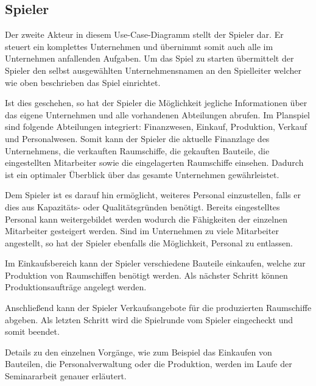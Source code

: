 \subsection{Spieler}
\label{sec:fachkonzept-spieler}

Der zweite Akteur in diesem Use-Case-Diagramm stellt der Spieler dar. Er steuert ein komplettes Unternehmen und übernimmt somit auch alle im Unternehmen anfallenden Aufgaben.
Um das Spiel zu starten übermittelt der Spieler den selbst ausgewählten Unternehmensnamen an den Spielleiter welcher wie oben beschrieben das Spiel einrichtet.

Ist dies geschehen, so hat der Spieler die Möglichkeit jegliche Informationen über das eigene Unternehmen und alle vorhandenen Abteilungen abrufen. Im Planspiel sind folgende Abteilungen integriert: Finanzwesen, Einkauf, Produktion, Verkauf und Personalwesen. Somit kann der Spieler die aktuelle Finanzlage des Unternehmens, die verkauften Raumschiffe, die gekauften Bauteile, die eingestellten Mitarbeiter sowie die eingelagerten Raumschiffe einsehen. Dadurch ist ein optimaler Überblick über das gesamte Unternehmen gewährleistet.

Dem Spieler ist es darauf hin ermöglicht, weiteres Personal einzustellen, falls er dies aus Kapazitäts- oder Qualitätsgründen benötigt. Bereits eingestelltes Personal kann weitergebildet werden wodurch die Fähigkeiten der einzelnen Mitarbeiter gesteigert werden. Sind im Unternehmen zu viele Mitarbeiter angestellt, so hat der Spieler ebenfalls die Möglichkeit, Personal zu entlassen.

Im Einkaufsbereich kann der Spieler verschiedene Bauteile einkaufen, welche zur Produktion von Raumschiffen benötigt werden. Als nächster Schritt können Produktionsaufträge angelegt werden. 

Anschließend kann der Spieler Verkaufsangebote für die produzierten Raumschiffe abgeben. Als letzten Schritt wird die Spielrunde vom Spieler eingecheckt und somit beendet. 

Details zu den einzelnen Vorgänge, wie zum Beispiel das Einkaufen von Bauteilen, die Personalverwaltung oder die Produktion, werden im Laufe der Seminararbeit genauer erläutert.